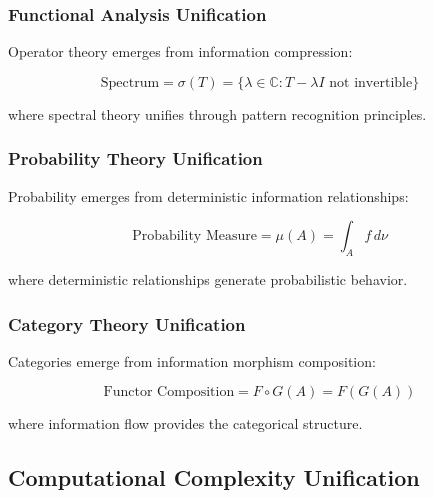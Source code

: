 \subsubsection{Functional Analysis Unification}

\begin{theorem}
Operator theory emerges from information compression:

\begin{equation}
\text{Spectrum} = \sigma(T) = \{ \lambda \in \mathbb{C} : T - \lambda I \text{ not invertible} \}
\end{equation}

where spectral theory unifies through pattern recognition principles.
\end{theorem}

\subsubsection{Probability Theory Unification}

\begin{theorem}
Probability emerges from deterministic information relationships:

\begin{equation}
\text{Probability Measure} = \mu(A) = \int_A f \, d\nu
\end{equation}

where deterministic relationships generate probabilistic behavior.
\end{theorem}

\subsubsection{Category Theory Unification}

\begin{theorem}
Categories emerge from information morphism composition:

\begin{equation}
\text{Functor Composition} = F \circ G (A) = F(G(A))
\end{equation}

where information flow provides the categorical structure.
\end{theorem}

\subsection{Computational Complexity Unification}

